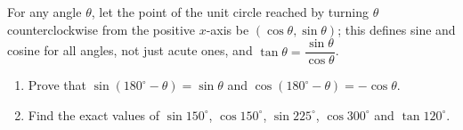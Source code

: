 For any angle $\theta$, let the point of the unit circle reached by turning $\theta$ counterclockwise from the positive $x$-axis be $(\cos\theta,\sin\theta)$; this defines sine and cosine for all angles, not just acute ones, and $\tan\theta=\dfrac{\sin\theta}{\cos\theta}$.
\begin{enumerate}
\item[(a)] Prove that $\sin\left(180^\circ-\theta\right)=\sin\theta$ and $\cos\left(180^\circ-\theta\right)=-\cos\theta$.
\item[(b)] Find the exact values of $\sin150^\circ$, $\cos150^\circ$, $\sin225^\circ$, $\cos300^\circ$ and $\tan120^\circ$.
\end{enumerate}
